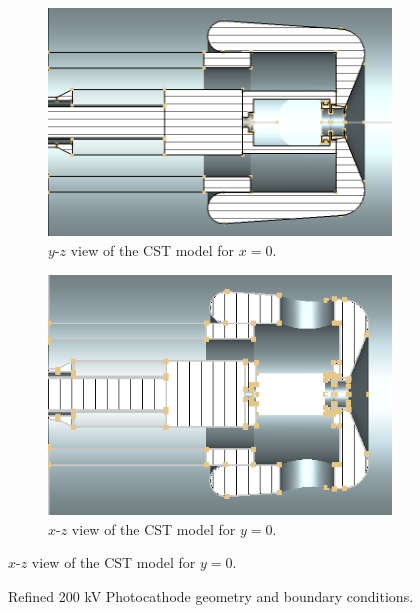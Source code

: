\begin{center}
\begin{figure}[H]
   \begin{subfigure}{0.45\textwidth}
      \includegraphics[width=\textwidth]{figures/200kV/png/v1_cutx}
      \caption{$y$-$z$ view of the CST model for $x=0$.}
      \label{fig:cst_geometry_yz}
   \end{subfigure}
   \begin{subfigure}{0.45\textwidth}
      \includegraphics[width=\textwidth]{figures/200kV/png/v1_cuty}
      \caption{$x$-$z$ view of the CST model for $y=0$.}
      \label{fig:cst_geometry_xz}
   \end{subfigure}
\end{figure}
\end{center}

\begin{center}
\begin{figure}[H]
  
  \caption{Refined 200 kV Photocathode geometry and boundary conditions.}
  \label{fig:200kV_geometry_v1}
\end{figure}
\end{center}

